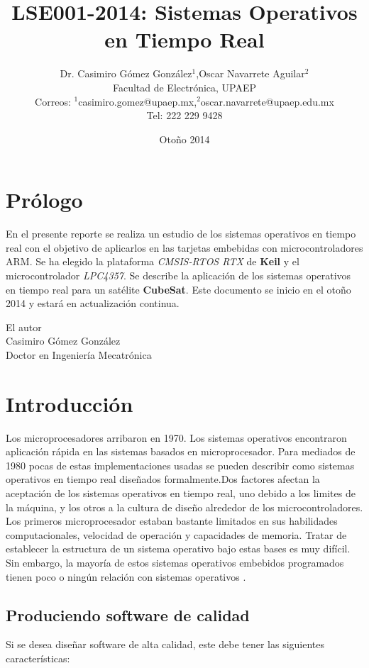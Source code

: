 \documentclass[12pt, twoside]{report}
\title{LSE001-2014: Sistemas Operativos en Tiempo Real}
\author{Dr. Casimiro Gómez González$^{1}$,Oscar Navarrete Aguilar$^{2}$\\
	Facultad de Electrónica, UPAEP\\
               Correos: $^{1}$casimiro.gomez@upaep.mx,$^{2}$oscar.navarrete@upaep.edu.mx\\
               Tel: 222 229 9428}
\date{Otoño 2014}
\begin{document}
\maketitle

\chapter*{Prólogo}

En el presente reporte se realiza un estudio de los sistemas operativos en tiempo real con el objetivo de aplicarlos en las tarjetas embebidas con microcontroladores ARM. Se ha elegido la plataforma \textit{CMSIS-RTOS RTX} de \textbf{Keil} y el microcontrolador \textit{LPC4357}. Se describe la aplicación de los sistemas operativos en tiempo real para un satélite \textbf{CubeSat}. Este documento se inicio en el otoño 2014 y estará en actualización continua.


\begin{flushright}
	
	El autor\\
	Casimiro Gómez González\\
	Doctor en Ingeniería Mecatrónica
\end{flushright}

\tableofcontents


\chapter{Introducción}

Los microprocesadores arribaron en 1970. Los sistemas operativos encontraron aplicación rápida en las sistemas basados en microprocesador. Para mediados de 1980 pocas de estas implementaciones usadas se pueden describir como sistemas operativos en tiempo real diseñados formalmente.Dos factores afectan la aceptación de los sistemas operativos en tiempo real, uno debido a los limites de la máquina, y los otros a la cultura de diseño alrededor de los microcontroladores. Los primeros microprocesador estaban bastante limitados en sus habilidades computacionales, velocidad de operación y capacidades de memoria. Tratar de establecer la estructura de un sistema operativo bajo estas bases es muy difícil. Sin embargo, la mayoría de estos sistemas operativos embebidos programados tienen poco o ningún relación con sistemas operativos \cite{Cooling2014}.

\section{Produciendo software de calidad}
Si se desea diseñar software de alta calidad, este debe tener las siguientes características:
\end{document}
